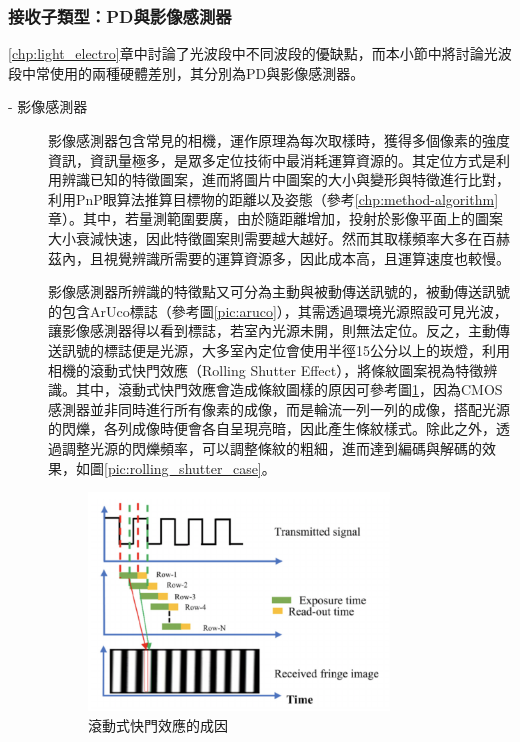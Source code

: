             \subsubsection{接收子類型：PD與影像感測器}
            \label{chp:light_receiver}

                

                \ref{chp:light_electro}章中討論了光波段中不同波段的優缺點，而本小節中將討論光波段中常使用的兩種硬體差別，其分別為PD與影像感測器。

                \begin{description}

                    \item[- 影像感測器]\hfill 
                    
                    \qquad
                    影像感測器包含常見的相機，運作原理為每次取樣時，獲得多個像素的強度資訊，資訊量極多，是眾多定位技術中最消耗運算資源的。其定位方式是利用辨識已知的特徵圖案，進而將圖片中圖案的大小與變形與特徵進行比對，利用PnP眼算法推算目標物的距離以及姿態（參考\ref{chp:method-algorithm}章）。其中，若量測範圍要廣，由於隨距離增加，投射於影像平面上的圖案大小衰減快速，因此特徵圖案則需要越大越好。然而其取樣頻率大多在百赫茲內，且視覺辨識所需要的運算資源多，因此成本高，且運算速度也較慢。

                    \qquad
                    影像感測器所辨識的特徵點又可分為主動與被動傳送訊號的，被動傳送訊號的包含ArUco標誌（參考圖\ref{pic:aruco}），其需透過環境光源照設可見光波，讓影像感測器得以看到標誌，若室內光源未開，則無法定位。反之，主動傳送訊號的標誌便是光源，大多室內定位會使用半徑15公分以上的崁燈，利用相機的滾動式快門效應（Rolling Shutter Effect），將條紋圖案視為特徵辨識。其中，滾動式快門效應會造成條紋圖樣的原因可參考圖\ref{pic:rolling_shutter}，因為CMOS感測器並非同時進行所有像素的成像，而是輪流一列一列的成像，搭配光源的閃爍，各列成像時便會各自呈現亮暗，因此產生條紋樣式。除此之外，透過調整光源的閃爍頻率，可以調整條紋的粗細，進而達到編碼與解碼的效果，如圖\ref{pic:rolling_shutter_case}。

                    \begin{figure}[ht]
                        \centering
                        \includegraphics[width=8cm]{ch2pic/rolling_shutter.png}
                        \caption{滾動式快門效應的成因\cite{pic:rolling_shutter}}
                        \label{pic:rolling_shutter}
                    \end{figure}


\end{description}
